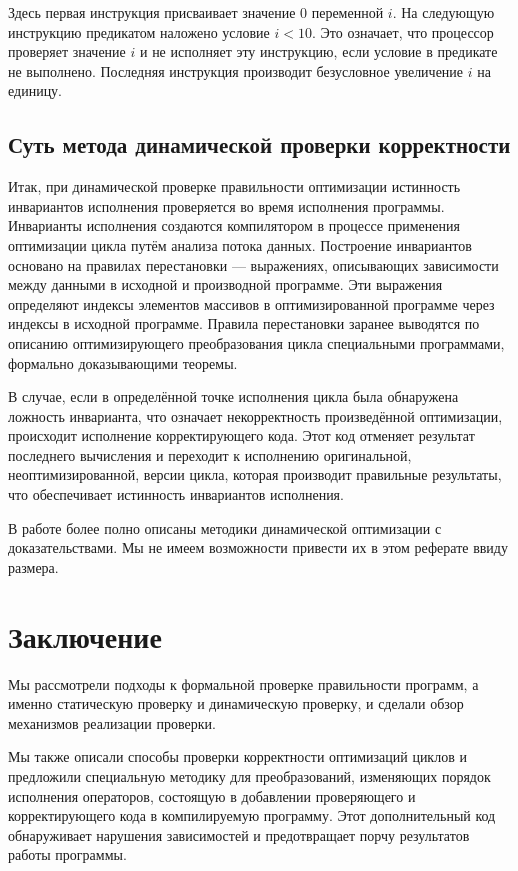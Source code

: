 Здесь первая инструкция присваивает значение $0$ переменной $i$. На следующую инструкцию предикатом наложено условие $i < 10$. Это означает, что процессор проверяет значение $i$ и не исполняет эту инструкцию, если условие в предикате не выполнено. Последняя инструкция производит безусловное увеличение $i$ на единицу.

\subsection{Суть метода динамической проверки корректности}
Итак, при динамической проверке правильности оптимизации истинность инвариантов исполнения проверяется во время исполнения программы. Инварианты исполнения создаются компилятором в процессе применения оптимизации цикла путём анализа потока данных. Построение инвариантов основано на правилах перестановки --- выражениях, описывающих зависимости между данными в исходной и производной программе. Эти выражения определяют индексы элементов массивов в оптимизированной программе через индексы в исходной программе. Правила перестановки заранее выводятся по описанию оптимизирующего преобразования цикла специальными программами, формально доказывающими теоремы.

В случае, если в определённой точке исполнения цикла была обнаружена ложность инварианта, что означает некорректность произведённой оптимизации, происходит исполнение корректирующего кода. Этот код отменяет результат последнего вычисления и переходит к исполнению оригинальной, неоптимизированной, версии цикла, которая производит правильные результаты, что обеспечивает истинность инвариантов исполнения.

В работе \cite{ZuckPFGH02} более полно описаны методики динамической оптимизации с доказательствами. Мы не имеем возможности привести их в этом реферате ввиду размера.

\section*{Заключение}
%

Мы рассмотрели подходы к формальной проверке правильности программ, а именно статическую проверку и динамическую проверку, и сделали обзор механизмов реализации проверки.

Мы также описали способы проверки корректности оптимизаций циклов и предложили специальную методику для преобразований, изменяющих порядок исполнения операторов, состоящую в добавлении проверяющего и корректирующего кода в компилируемую программу. Этот дополнительный код обнаруживает нарушения зависимостей и предотвращает порчу результатов работы программы.
